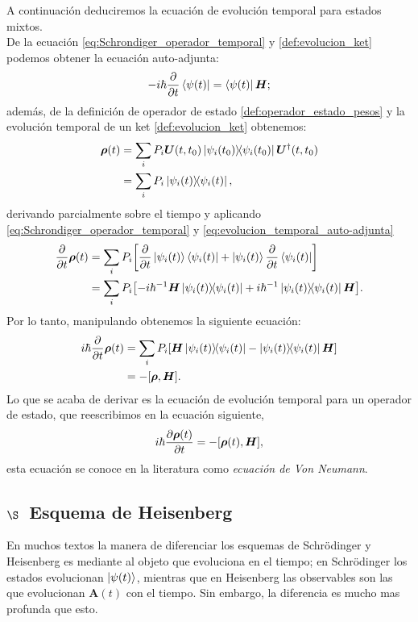 \documentclass[../Main.tex]{subfiles}
\begin{document}
A continuación deduciremos la ecuación de evolución temporal para estados mixtos.\\ De la ecuación \eqref{eq:Schrondiger_operador_temporal} y \eqref{def:evolucion_ket} podemos obtener la ecuación auto-adjunta: 
\begin{equation}
    -i\hbar\pdv{t}\bra{\psi(t)}=\bra{\psi(t)}\bm{H};
    \label{eq:evolucion_temporal_auto-adjunta}
\end{equation}
además, de la definición de operador de estado \eqref{def:operador_estado_pesos} y la evolución temporal de un ket \eqref{def:evolucion_ket} obtenemos:
\begin{align}
    \bm{\rho}(t)&=\sum_i P_i \bm{U}(t,t_0)\op{\psi_i(t_0)}\bm{U}^\dagger(t,t_0)\notag\\
    &= \sum_i P_i \op{\psi_i(t)},
\end{align}
derivando parcialmente sobre el tiempo y aplicando \eqref{eq:Schrondiger_operador_temporal} y \eqref{eq:evolucion_temporal_auto-adjunta}
\begin{align}
    \pdv{t}\bm{\rho}(t)&= \sum_i P_i\qty[\pdv{t}\ket{\psi_i(t)}\bra{\psi_i(t)}+\ket{\psi_i(t)}\pdv{t}\bra{\psi_i(t)}]\notag\\
    &=\sum_i P_i \qty[-i\hbar^{-1}\bm{H}\op{\psi_i(t)}+i\hbar^{-1}\op{\psi_i(t)}\bm{H}].
\end{align}
Por lo tanto, manipulando obtenemos la siguiente ecuación:
\begin{align}
    i\hbar \pdv{t}\bm{\rho}(t)&=\sum_i P_i \qty[\bm{H}\op{\psi_i(t)}-\op{\psi_i(t)}\bm{H}]\notag\\
    &= -\qty[\bm{\rho},\bm{H}].
\end{align}
Lo que se acaba de derivar es la ecuación de evolución temporal para un operador de estado, que reescribimos en la ecuación siguiente,
\begin{equation}
    i\hbar \pdv{\bm{\rho}(t)}{t}=-\qty[\bm{\rho}(t),\bm{H}],
    \label{eq:evolucion_temporal_operador}
\end{equation}
esta ecuación se conoce en la literatura como \emph{ecuación de Von Neumann}.



\subsection*{$\S$~Esquema de Heisenberg}

En muchos textos la manera de diferenciar los esquemas de Schrödinger y Heisenberg es mediante al objeto que evoluciona en el tiempo; en Schrödinger los estados evolucionan $\ket{\psi(t)}$, mientras que en Heisenberg las observables son las que evolucionan $\bm{A}(t)$ con el tiempo. Sin embargo, la diferencia es mucho mas profunda que esto.
\end{document}

